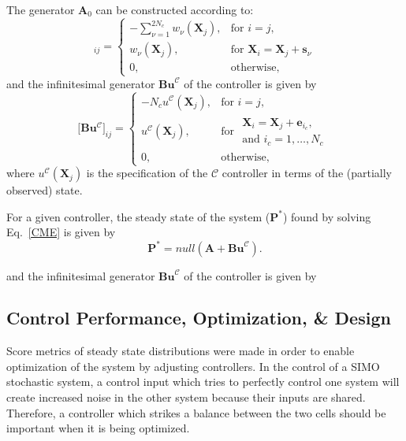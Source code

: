 \documentclass[12pt]{article}
\begin{document}
 
The generator $\mathbf{A}_0$ can be constructed according to:
\begin{equation}
[\mathbf{A}_0]_{ij} = \left\{
\begin{array}{rl}
-\sum_{\nu =1}^{2N_c} w_{\nu}(\mathbf{X}_j), &\text{for }i=j,\\
w_{\nu}(\mathbf{X}_j), &\text{for }\mathbf{X}_i = \mathbf{X}_j+\mathbf{s}_\nu\\
0, & \text{otherwise,}
\end{array}\right. 
\label{InfA}
\end{equation}
and the infinitesimal generator $\mathbf{Bu}^{\mathcal{C}}$ of the controller is given by
\begin{equation}
[\mathbf{Bu^{\mathcal{C}}]}_{ij} = \left\{
\begin{array}{rl}
- N_c{u}^{\mathcal{C}}(\mathbf{X}_j), &\text{for }i=j,\\
{u}^{\mathcal{C}}(\mathbf{X}_j), &\text{for }\begin{array}{ll}\mathbf{X}_i =\mathbf{X}_j + \mathbf{e}_{i_c}, \\ \text{and } i_c = 1,\ldots,N_c\end{array}\\
0, & \text{otherwise,}
\end{array}\right.
\label{InfB}
\end{equation}
where ${u}^{\mathcal{C}}(\mathbf{X}_j)$ is the specification of the $\mathcal{C}$ controller in terms of the (partially observed) state.

For a given controller, the steady state of the system ($\mathbf{P}^*$) found by solving Eq.\ \ref{CME} is given by
\begin{equation}
\mathbf{P}^*=null(\mathbf{A}+\textbf{Bu}^{\mathcal{C}}).\label{SSDist}
\end{equation}


and the infinitesimal generator $\mathbf{Bu}^{\mathcal{C}}$ of the controller is given by




\subsection{Control Performance, Optimization, \& Design}
Score metrics of steady state distributions were made in order to enable optimization of the system by adjusting controllers. In the control of a SIMO stochastic system, a control input which tries to perfectly control one system will create increased noise in the other system because their inputs are shared. Therefore, a controller which strikes a balance between the two cells should be important when it is being optimized.
\end{document}
